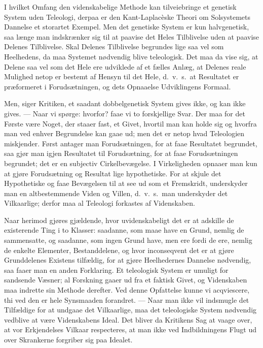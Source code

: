 \documentclass[12pt]{book}
\newcommand{\apage}[1]{\marginnote{\footnotesize\textit{[#1]}}}
\begin{document}
I hvilket Omfang den videnskabelige Methode kan tilveiebringe et genetisk
System uden Teleologi, derpaa er den Kant-Laplacèske Theori om Solsystemets
Dannelse et storartet Exempel. Men det genetiske System er kun
halvgenetisk, saa længe man indskrænker sig til at paavise det Heles
Tilblivelse uden at paavise Delenes Tilblivelse. Skal Delenes Tilblivelse
begrundes lige saa vel som Heelhedens, da maa Systemet nødvendig blive
teleologisk. Det maa da vise sig, at Delene saa vel som det Hele ere
udviklede af et fælles Anlæg, at Delenes reale Mulighed netop er bestemt af
Hensyn til det Hele, d.\ v.\ s.\ at Resultatet er præformeret i Forudsætningen,
og dets Opnaaelse Udviklingens Formaal.

Men, siger Kritiken, et saadant dobbelgenetisk System gives ikke, og kan ikke gives. --- Naar vi spørge: hvorfor? faae vi to forskjellige Svar. Der maa
for det Første være Noget, der staaer fast, et Givet, hvortil man kan holde
sig og hvorfra man ved enhver Begrundelse kan gaae ud; men det er netop
hvad Teleologien miskjender. Først antager man Forudsætningen, for at faae
Resultatet begrundet, saa gjør man igjen Resultatet til Forudsætning, for
at faae Forudsætningen \apage{74} begrundet; det er en subjectiv Cirkelbevægelse. I Virkeligheden opnaaer man kun at gjøre Forudsætning og Resultat lige
hypothetiske. For at skjule det Hypothetiske og faae Bevægelsen til at see
ud som et Fremskridt, underskyder man en altbestemmende Viden og Villen,
d.\ v.\ s.\ man underskyder det Vilkaarlige; derfor maa al Teleologi forkastes
af Videnskaben.

Naar herimod gjøres gjældende, hvor uvidenskabeligt det er at adskille de
existerende Ting i to Klasser: saadanne, som maae have en Grund, nemlig de
sammensatte, og saadanne, som ingen Grund have, men ere fordi de ere,
nemlig de enkelte Elementer, Bestanddelene, og hvor inconseqvent det er at
gjøre Grunddelenes Existens tilfældig, for at gjøre Heelhedernes Dannelse
nødvendig, saa faaer man en anden Forklaring. Et teleologisk System er
umuligt for sandsende Væsner; al Forskning gaaer ud fra et faktisk Givet,
og Videnskaben maa indrette sin Methode derefter. Ved denne Opfattelse
kunne vi acqviescere, thi ved den er hele Synsmaaden forandret. --- Naar
man ikke vil indsmugle det Tilfældige for at undgaae det Vilkaarlige, maa
det teleologiske System nødvendig vedblive at være Videnskabens Ideal. Det
bliver da Kritikens Sag at vaage over, at vor Erkjendelses Vilkaar
respecteres, at man ikke ved Indbildningens Flugt ud over Skrankerne
forgriber sig paa Idealet.
\end{document}
